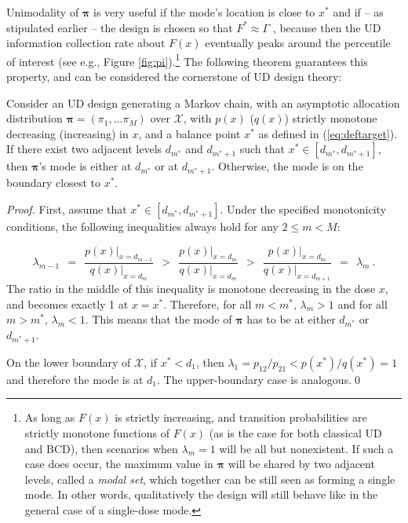 Unimodality of $\boldsymbol{\pi}$ is very useful if the mode's location is close to $x^*$ and if -- as stipulated earlier -- the design is chosen so that $F^*\approx\Gamma$ , because then the UD information collection rate about $F(x)$ eventually peaks around the percentile of interest (see e.g., Figure \ref{fig:pi}).\footnote{As long as $F(x)$ is strictly increasing, and transition probabilities are strictly monotone functions of $F(x)$ (as is the case for both classical UD and BCD), then scenarios when $\lambda_m=1$ will be all but nonexistent. If such a case does occur, the maximum value in $\boldsymbol{\pi}$ will be shared by two adjacent levels, called a \emph{modal set}, which together can be still seen as forming a single mode. In other words, qualitatively the design will still behave like in the general case of a single-dose mode.} The following theorem guarantees this property, and can be considered the cornerstone of UD design theory:

\begin{thm}\label{thm:mode} Consider an UD design generating a Markov chain, with an asymptotic allocation distribution $\boldsymbol{\pi}=\left(\pi_1,\ldots \pi_M\right)$ over $\mathcal{X}$, with $p(x)$ ($q(x)$) strictly monotone decreasing (increasing) in $x$, and a balance point $x^*$ as defined in (\ref{eq:deftarget}). If there exist two adjacent levels $d_{m^*}$ and $d_{m^*+1}$ such that $x^*\in\left[d_{m^*},d_{m^*+1}\right]$, then $\boldsymbol{\pi}$'s mode is either at $d_{m^*}$ or at $d_{m^*+1}$. Otherwise, the mode is on the boundary closest to $x^*$.
\end{thm}

\begin{proof} First, assume that $x^*\in\left[d_{m^*},d_{m^*+1}\right]$. Under the specified monotonicity conditions, the following inequalities always hold for any $2\leq m<M$:

\begin{equation}\label{eq:gammas1}
\lambda_{m-1}\ \ =\ \ \frac{p(x)\big |_{x=d_{m-1}}}{q(x)\big |_{x=d_m}}\ \ >\ \ \frac{p(x)\big |_{x=d_m}}{q(x)\big |_{x=d_{m}}}\ \ >\ \ \frac{p(x)\big |_{x=d_m}}{q(x)\big |_{x=d_{m+1}}}\ \ =\ \ \lambda_m\ .
\end{equation}
\noindent The ratio in the middle of this inequality is monotone decreasing in the dose $x$, and becomes exactly 1 at $x=x^*$. Therefore, for all $m<m^*$, $\lambda_m>1$ and for all $m>m^*$, $\lambda_m<1$. This means that the mode of $\boldsymbol{\pi}$ has to be at either $d_{m^*}$ or $d_{m^*+1}$.

\noindent On the lower boundary of $\mathcal{X}$, if $x^*<d_1$, then $\lambda_1=p_{12}/p_{21}<p\left(x^*\right)/q\left(x^*\right)=1$ and therefore the mode is at $d_1$. The upper-boundary case is analogous.\qed\end{proof}

